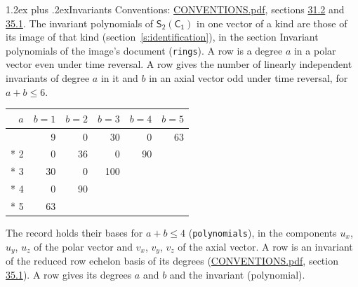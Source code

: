 \documentclass[10pt,a4paper]{article}
\makeatletter
\renewcommand\section{\@startsection{section}{1}{\z@}{-3ex plus -1ex minus -.2ex}%
  {1.2ex plus .2ex}{\normalfont\large\sffamily\bfseries\color{parttitle}}}
\numberwithin{equation}{section}
\newcommand{\grp}[1]{\mathsf{#1}}
\makeatother
\begin{document}
\section{Invariants}\label{s:invariants}
Conventions: \href{../../CONVENTIONS.pdf}{CONVENTIONS.pdf}, sections \href{../../CONVENTIONS.pdf\#conv.31.2}{31.2} and \href{../../CONVENTIONS.pdf\#conv.35.1}{35.1}.
The invariant polynomials of $\grp{S_{2}}(\grp{C_{1}})$ in one vector of a kind are those of its image of that kind (section~\ref{s:identification}), in the section Invariant polynomials of the image's document (\texttt{rings}).
\leavevmode\label{n:index.degree.polar}\label{n:index.degree.axial}A row is a degree $a$ in a polar vector even under time reversal. A row gives the number of linearly independent invariants of degree $a$ in it and $b$ in an axial vector odd under time reversal, for $a + b \le 6$.
{\small\begin{longtable}{@{}rrrrrr@{}}\toprule
$a$ & $b = 1$ & $b = 2$ & $b = 3$ & $b = 4$ & $b = 5$\\\midrule\endhead
\bottomrule\endfoot\endlastfoot
1 & 9 & 0 & 30 & 0 & 63\\*
2 & 0 & 36 & 0 & 90 & \\*
3 & 30 & 0 & 100 &  & \\*
4 & 0 & 90 &  &  & \\*
5 & 63 &  &  &  & \\
\bottomrule\end{longtable}}
\leavevmode\label{n:local.component.polar}\label{n:local.component.axial}The record holds their bases for $a + b \le 4$ (\texttt{polynomials}), in the components $u_{x}$, $u_{y}$, $u_{z}$ of the polar vector and $v_{x}$, $v_{y}$, $v_{z}$ of the axial vector. \label{n:head.polynomial}A row is an invariant of the reduced row echelon basis of its degrees (\href{../../CONVENTIONS.pdf}{CONVENTIONS.pdf}, section \href{../../CONVENTIONS.pdf\#conv.35.1}{35.1}). A row gives its degrees $a$ and $b$ and the invariant (polynomial).
\end{document}
